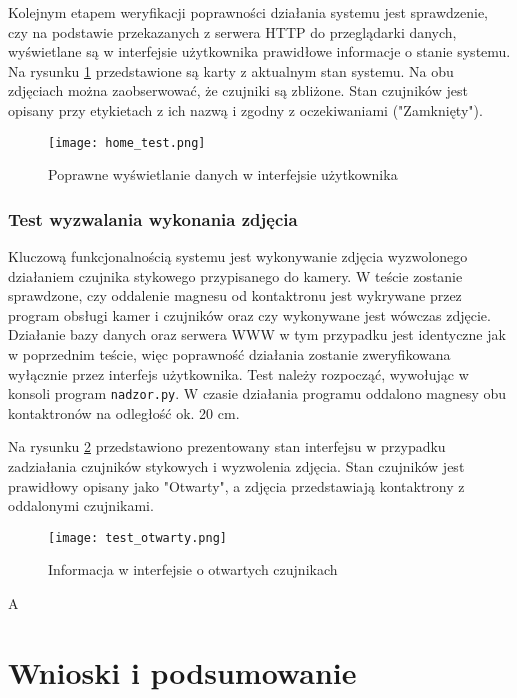 \documentclass[a4paper,11pt,twoside]{article}
\begin{document}
Kolejnym etapem weryfikacji poprawności działania systemu jest sprawdzenie, czy na podstawie przekazanych z serwera HTTP do przeglądarki danych, wyświetlane są w interfejsie użytkownika prawidłowe informacje o stanie systemu. Na rysunku \ref{fig: home_test} przedstawione są karty z aktualnym stan systemu. Na obu zdjęciach można zaobserwować, że czujniki są zbliżone. Stan czujników jest opisany przy etykietach z ich nazwą i zgodny z oczekiwaniami ("Zamknięty").

\begin{figure}
\begin{center}
\texttt{[image: home\_test.png]}
\caption{Poprawne wyświetlanie danych w interfejsie użytkownika}
\label{fig: home_test}
\end{center}
\end{figure}

\subsubsection{Test wyzwalania wykonania zdjęcia}
Kluczową funkcjonalnością systemu jest wykonywanie zdjęcia wyzwolonego działaniem czujnika stykowego przypisanego do kamery. W teście zostanie sprawdzone, czy oddalenie magnesu od kontaktronu jest wykrywane przez program obsługi kamer i czujników oraz czy wykonywane jest wówczas zdjęcie. Działanie bazy danych oraz serwera WWW w tym przypadku jest identyczne jak w poprzednim teście, więc poprawność działania zostanie zweryfikowana wyłącznie przez interfejs użytkownika. Test należy rozpocząć, wywołując w konsoli program \texttt{nadzor.py}. W czasie działania programu oddalono magnesy obu kontaktronów na odległość ok. 20 cm.

Na rysunku \ref{fig: test_otwarty} przedstawiono prezentowany stan interfejsu w przypadku zadziałania czujników stykowych i wyzwolenia zdjęcia. Stan czujników jest prawidłowy opisany jako "Otwarty", a zdjęcia przedstawiają kontaktrony z oddalonymi czujnikami.
\begin{figure}[H]
\begin{center}
\texttt{[image: test\_otwarty.png]}
\caption{Informacja w interfejsie o otwartych czujnikach}
\label{fig: test_otwarty}
\end{center}
\end{figure}

A

\newpage
\section{Wnioski i podsumowanie}
\end{document}
